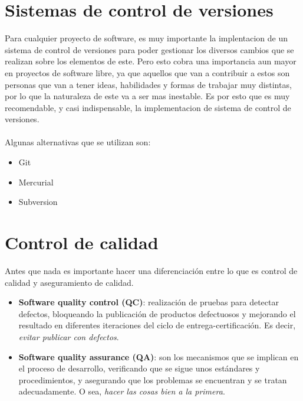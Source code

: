 \section{Sistemas de control de versiones}

Para cualquier proyecto de software, es muy importante la implentacion de un sistema de control de versiones para poder gestionar los diversos cambios que se realizan sobre los elementos de este.
Pero esto cobra una importancia aun mayor en proyectos de software libre, ya que aquellos que van a contribuir a estos son personas que van a tener ideas, habilidades y formas de trabajar muy distintas, por lo que la naturaleza de este va a ser mas inestable.
Es por esto que es muy recomendable, y casi indispensable, la implementacion de sistema de control de versiones.
\\
\\
Algunas alternativas que se utilizan son:
\begin{itemize}
    \item Git
    \item Mercurial
    \item Subversion    
\end{itemize}

\section{Control de calidad}

Antes que nada es importante hacer una diferenciación entre lo que es control de calidad y aseguramiento de calidad.

\begin{itemize}
     \item\textbf{Software quality control (QC)}: realización de pruebas para detectar defectos, bloqueando la publicación de productos defectuosos y mejorando el resultado en diferentes iteraciones del ciclo de entrega-certificación. Es decir, \textit{evitar publicar con defectos}.
     \item\textbf{Software quality assurance (QA)}: son los mecanismos que se implican en el proceso de desarrollo, verificando que se sigue unos estándares y procedimientos, y asegurando que los problemas se encuentran y se tratan adecuadamente. O sea, \textit{hacer las cosas bien a la primera}.
\end{itemize}

